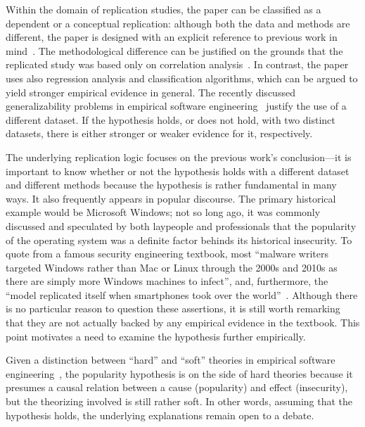 \documentclass[5p, twocolumn, numbers, sort]{elsarticle}
\begin{document}

Within the domain of replication studies, the paper can be classified as a
dependent or a conceptual replication: although both the data and methods are
different, the paper is designed with an explicit reference to previous work in
mind~\cite{Fabrigar16, Gomez14, Ruohonen15COSE}. The methodological difference
can be justified on the grounds that the replicated study was based only on
correlation analysis~\cite{Siavvas18}. In contrast, the paper uses also
regression analysis and classification algorithms, which can be argued to yield
stronger empirical evidence in general. The recently discussed generalizability
problems in empirical software engineering~\cite{Baltes22} justify the use of a
different dataset. If the hypothesis holds, or does not hold, with two distinct
datasets, there is either stronger or weaker evidence for it, respectively.

The underlying replication logic focuses on the previous work's conclusion---it
is important to know whether or not the hypothesis holds with a different
dataset and different methods because the hypothesis is rather fundamental in
many ways. It also frequently appears in popular discourse. The primary
historical example would be Microsoft Windows; not so long ago, it was commonly
discussed and speculated by both laypeople and professionals that the popularity
of the operating system was a definite factor behinds its historical
insecurity. To quote from a famous security engineering textbook, most ``malware
writers targeted Windows rather than Mac or Linux through the 2000s and 2010s as
there are simply more Windows machines to infect'', and, furthermore, the
``model replicated itself when smartphones took over the
world''~\cite[p.~296]{Anderson08}. Although there is no particular reason to
question these assertions, it is still worth remarking that they are not
actually backed by any empirical evidence in the textbook. This point motivates
a need to examine the hypothesis further empirically.

Given a distinction between ``hard'' and ``soft'' theories in empirical software
engineering~\cite{Russo19}, the popularity hypothesis is on the side of hard
theories because it presumes a causal relation between a cause (popularity) and
effect (insecurity), but the theorizing involved is still rather soft. In other
words, assuming that the hypothesis holds, the underlying explanations remain
open to a debate.
\end{document}
